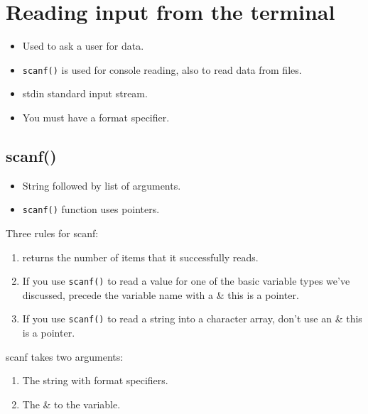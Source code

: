 \section{Reading input from the terminal}
\begin{itemize}
    \item Used to ask a user for data. 
    \item \texttt{scanf()} is used for console reading, also to read data from files. 
    \item stdin standard input stream. 
    \item You must have a format specifier. 
\end{itemize}
\subsection{scanf()}
\begin{itemize}
    \item String followed by list of arguments. 
    \item \texttt{scanf()} function uses pointers.
\end{itemize}
Three rules for scanf:
\begin{enumerate}
    \item returns the number of items that it successfully reads.
    \item If you use \texttt{scanf()} to read a value for one of the basic variable types we've discussed, precede the variable name with a \& this is a pointer.
    \item If you use \texttt{scanf()} to read a string into a character array, don't use an \& this is a pointer.
\end{enumerate}
scanf takes two arguments: 
\begin{enumerate}
    \item The string with format specifiers.
    \item The \& to the variable. 
\end{enumerate}
